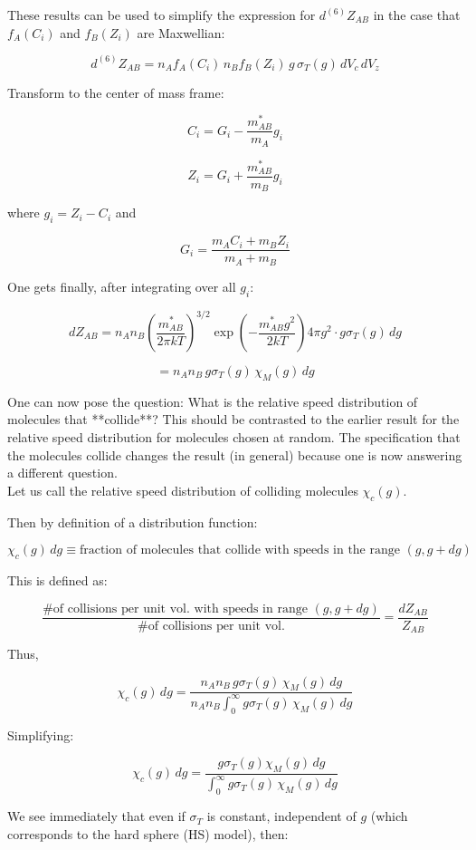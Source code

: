 \documentclass{article}
\begin{document}
These results can be used to simplify the expression for \( d^{(6)} Z_{AB} \) in the case that \( f_A(C_i) \) and \( f_B(Z_i) \) are Maxwellian:

\[
d^{(6)} Z_{AB} = n_A f_A(C_i) \, n_B f_B(Z_i) \, g \, \sigma_T(g) \, dV_c \, dV_z
\]

Transform to the center of mass frame:

\[
C_i = G_i - \frac{m_{AB}^*}{m_A} g_i
\]

\[
Z_i = G_i + \frac{m_{AB}^*}{m_B} g_i
\]

where \( g_i = Z_i - C_i \) and

\[
G_i = \frac{m_A C_i + m_B Z_i}{m_A + m_B}
\]


One gets finally, after integrating over all \( g_i \):

\[
dZ_{AB} = n_A n_B \left( \frac{m_{AB}^*}{2\pi k T} \right)^{3/2} \exp \left( - \frac{m_{AB}^* g^2}{2 k T} \right) 4\pi g^2 \cdot g \sigma_T(g) \, dg
\]

\[
= n_A n_B \, g \sigma_T(g) \, \chi_M(g) \, dg
\]

One can now pose the question: What is the relative speed distribution of molecules that **collide**? This should be contrasted to the earlier result for the relative speed distribution for molecules chosen at random. The specification that the molecules collide changes the result (in general) because one is now answering a different question.\\

Let us call the relative speed distribution of colliding molecules \( \chi_c(g) \).

Then by definition of a distribution function:

\[
\chi_c(g) \, dg \equiv \text{fraction of molecules that collide with speeds in the range } (g, g + dg)
\]

This is defined as:

\[
\frac{\text{\# of collisions per unit vol. with speeds in range } (g, g+dg)}{\text{\# of collisions per unit vol.}} = \frac{dZ_{AB}}{Z_{AB}}
\]

Thus,

\[
\chi_c(g) \, dg = \frac{n_A n_B \, g \sigma_T(g) \, \chi_M(g) \, dg}{n_A n_B \int_{0}^{\infty} g \sigma_T(g) \, \chi_M(g) \, dg}
\]

Simplifying:

\[
\chi_c(g) \, dg = \frac{g \sigma_T(g) \chi_M(g) \, dg}{\int_{0}^{\infty} g \sigma_T(g) \, \chi_M(g) \, dg}
\]

We see immediately that even if \( \sigma_T \) is constant, independent of \( g \) (which corresponds to the hard sphere (HS) model), then:
\end{document}
